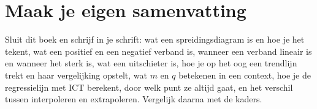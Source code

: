 \ifzelfstudie
\section*{Maak je eigen samenvatting}
Sluit dit boek en schrijf in je schrift: wat een spreidingsdiagram is en hoe je het tekent, wat een positief en een negatief verband is, wanneer een verband lineair is en wanneer het sterk is, wat een uitschieter is, hoe je op het oog een trendlijn trekt en haar vergelijking opstelt, wat $m$ en $q$ betekenen in een context, hoe je de regressielijn met ICT berekent, door welk punt ze altijd gaat, en het verschil tussen interpoleren en extrapoleren. Vergelijk daarna met de kaders.
\fi
